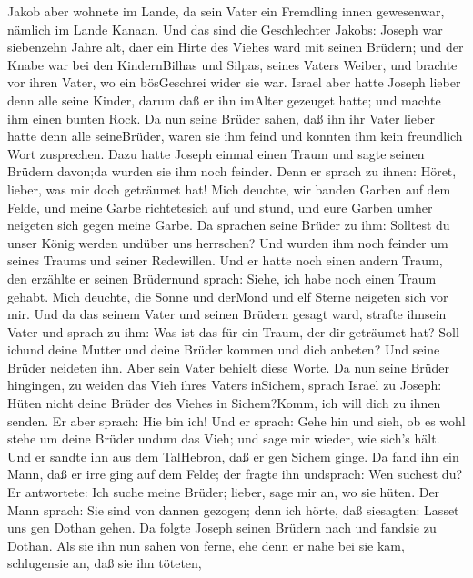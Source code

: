  Jakob aber wohnete im Lande, da sein Vater ein Fremdling
innen gewesenwar, nämlich im Lande Kanaan.  Und das sind die
Geschlechter Jakobs: Joseph war siebenzehn Jahre alt, daer ein Hirte des
Viehes ward mit seinen Brüdern; und der Knabe war bei den KindernBilhas
und Silpas, seines Vaters Weiber, und brachte vor ihren Vater, wo ein
bösGeschrei wider sie war.  Israel aber hatte Joseph lieber
denn alle seine Kinder, darum daß er ihn imAlter gezeuget hatte; und
machte ihm einen bunten Rock.  Da nun seine Brüder sahen,
daß ihn ihr Vater lieber hatte denn alle seineBrüder, waren sie ihm
feind und konnten ihm kein freundlich Wort zusprechen.  Dazu
hatte Joseph einmal einen Traum und sagte seinen Brüdern davon;da wurden
sie ihm noch feinder.  Denn er sprach zu ihnen: Höret,
lieber, was mir doch geträumet hat!  Mich deuchte, wir
banden Garben auf dem Felde, und meine Garbe richtetesich auf und stund,
und eure Garben umher neigeten sich gegen meine Garbe.  Da
sprachen seine Brüder zu ihm: Solltest du unser König werden undüber uns
herrschen? Und wurden ihm noch feinder um seines Traums und seiner
Redewillen.  Und er hatte noch einen andern Traum, den
erzählte er seinen Brüdernund sprach: Siehe, ich habe noch einen Traum
gehabt. Mich deuchte, die Sonne und derMond und elf Sterne neigeten sich
vor mir.  Und da das seinem Vater und seinen Brüdern gesagt
ward, strafte ihnsein Vater und sprach zu ihm: Was ist das für ein
Traum, der dir geträumet hat? Soll ichund deine Mutter und deine Brüder
kommen und dich anbeten?  Und seine Brüder neideten ihn.
Aber sein Vater behielt diese Worte.  Da nun seine Brüder
hingingen, zu weiden das Vieh ihres Vaters inSichem, 
sprach Israel zu Joseph: Hüten nicht deine Brüder des Viehes in
Sichem?Komm, ich will dich zu ihnen senden. Er aber sprach: Hie bin ich!
 Und er sprach: Gehe hin und sieh, ob es wohl stehe um
deine Brüder undum das Vieh; und sage mir wieder, wie sich's hält. Und
er sandte ihn aus dem TalHebron, daß er gen Sichem ginge. 
Da fand ihn ein Mann, daß er irre ging auf dem Felde; der fragte ihn
undsprach: Wen suchest du?  Er antwortete: Ich suche meine
Brüder; lieber, sage mir an, wo sie hüten.  Der Mann
sprach: Sie sind von dannen gezogen; denn ich hörte, daß siesagten:
Lasset uns gen Dothan gehen. Da folgte Joseph seinen Brüdern nach und
fandsie zu Dothan.  Als sie ihn nun sahen von ferne, ehe
denn er nahe bei sie kam, schlugensie an, daß sie ihn töteten,
